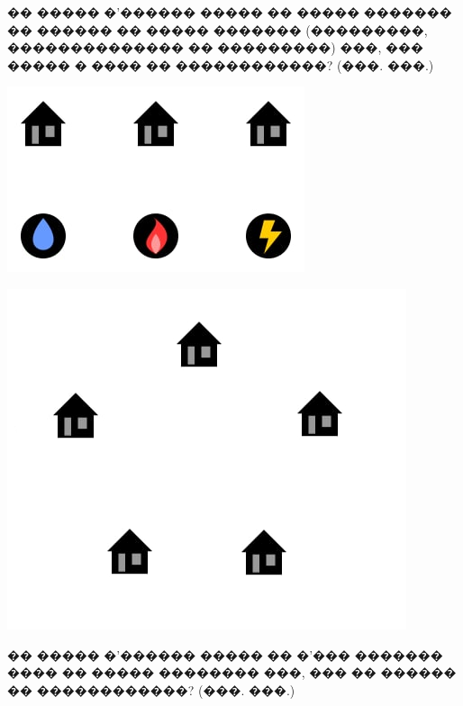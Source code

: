 \documentclass[a4paper,12pt]{article}
\begin{document}
\begin{enumerate}
\begin{minipage}{.35\textwidth}
       \item �� ����� �'������ ����� �� ����� ������� �� ������ �� ����� ������� (���������, �������������� �� ���������) ���, ��� ����� � ���� �� ������������? (���. ���.)
\end{minipage}
\begin{minipage}{.55\textwidth}
\begin{center}
      \includegraphics[scale=0.8]{three_houses}
\end{center}
\end{minipage}


\begin{minipage}{.55\textwidth}
\begin{center}
       \includegraphics[scale=0.8]{five_houses}
\end{center}
\end{minipage}
\begin{minipage}{.35\textwidth}

      \item �� ����� �'������ ����� �� �'��� ������� ���� �� ����� �������� ���, ��� �� ������ �� ������������? (���. ���.)
\end{minipage}



\end{enumerate}
\end{document}
